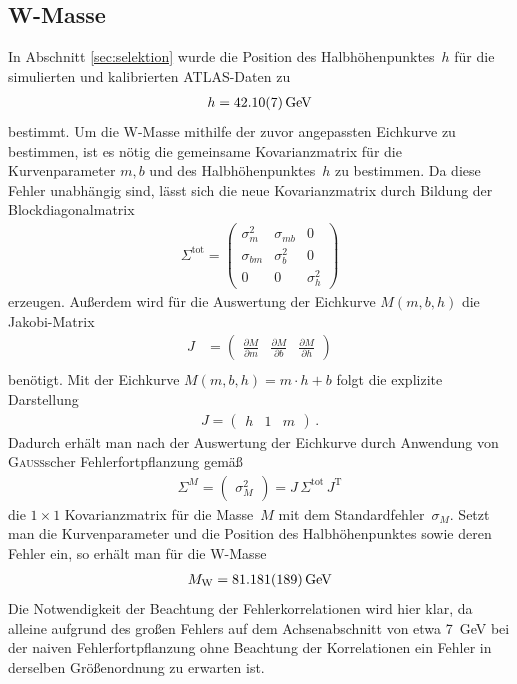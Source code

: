 \documentclass[11pt, a4paper]{article}
\numberwithin{equation}{section}
\begin{document}
\subsection{W-Masse}
In Abschnitt \ref{sec:selektion} wurde die Position des Halbhöhenpunktes~$h$ für die simulierten und kalibrierten ATLAS-Daten zu
\begin{align}
	h = \SI{42.10 +- 0.07}{\GeV}
	\label{eq:messwert_w_h}
\end{align}
bestimmt.
Um die W-Masse mithilfe der zuvor angepassten Eichkurve zu bestimmen, ist es nötig die gemeinsame Kovarianzmatrix für die Kurvenparameter $m, b$ und des Halbhöhenpunktes~$h$ zu bestimmen.
Da diese Fehler unabhängig sind, lässt sich die neue Kovarianzmatrix durch Bildung der Blockdiagonalmatrix
\begin{align*}
	\Sigma^\mathrm{tot} = \begin{pmatrix}
		\sigma_m^2  & \sigma_{mb} & 0 \\
		\sigma_{bm} & \sigma_b^2  & 0 \\
		0           & 0           & \sigma_h^2
	\end{pmatrix}
\end{align*}
erzeugen.
Außerdem wird für die Auswertung der Eichkurve $M(m, b, h)$ die Jakobi-Matrix
\begin{align*}
	J &= \begin{pmatrix}
	\frac{\partial M}{\partial m} &
	\frac{\partial M}{\partial b} &
	\frac{\partial M}{\partial h}
	\end{pmatrix} \\
\end{align*}
benötigt.
Mit der Eichkurve $M(m, b, h) = m \cdot h + b$ folgt die explizite Darstellung
\begin{align*}
	J=\begin{pmatrix}
	h & 1 & m
	\end{pmatrix} \, \text{.}
\end{align*}
Dadurch erhält man nach der Auswertung der Eichkurve durch Anwendung von \textsc{Gauß}scher Fehlerfortpflanzung gemäß \cite{error_prop}
\begin{align*}
	\Sigma^M = \begin{pmatrix}
	\sigma_{M}^2
	\end{pmatrix} = J \, \Sigma^\mathrm{tot} \, J^\mathrm{T}
\end{align*}
die $1 \times 1$ Kovarianzmatrix für die Masse~$M$ mit dem Standardfehler~$\sigma_M$.
Setzt man die Kurvenparameter und die Position des Halbhöhenpunktes sowie deren Fehler ein, so erhält man für die W-Masse
\begin{align*}
	M_\mathrm{W} = \SI{81.181 +- 0.189}{\GeV}
\end{align*}
Die Notwendigkeit der Beachtung der Fehlerkorrelationen wird hier klar, da alleine aufgrund des großen Fehlers auf dem Achsenabschnitt von etwa \SI{7}{\GeV} bei der naiven Fehlerfortpflanzung ohne Beachtung der Korrelationen ein Fehler in derselben Größenordnung zu erwarten ist.
\end{document}
